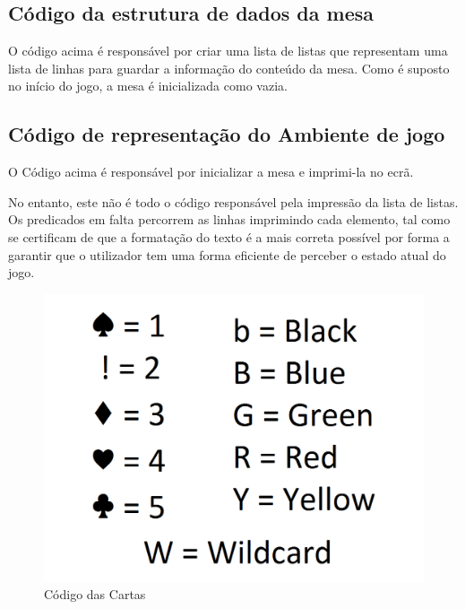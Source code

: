 \documentclass[a4paper]{article}
\begin{document}
	\subsection{Código da estrutura de dados da mesa}
	
	\small
	\lstset{language=Prolog}
	
	\normalsize
	O código acima é responsável por criar uma lista de listas que representam uma lista de linhas para guardar a informação do conteúdo da mesa. Como é suposto no início do jogo, a mesa é inicializada como vazia.\\
	
	\newpage
	
	\subsection{Código de representação do Ambiente de jogo}
	\small
	\lstset{language=Prolog}
	
	\normalsize
	O Código acima é responsável por inicializar a mesa e imprimi-la no ecrã.
	
	No entanto, este não é todo o código responsável pela impressão da lista de listas. Os predicados em falta percorrem as linhas imprimindo cada elemento, tal como se certificam de que a formatação do texto é a mais correta possível por forma a garantir que o utilizador tem uma forma eficiente de perceber o estado atual do jogo.
	
	\begin{figure}[h!]
	\begin{center}
	\includegraphics[scale=0.2]{./res/cardCode.png}
	\caption{Código das Cartas}
	\label{fig:example1}
	\end{center}
	\end{figure}
	
\end{document}
